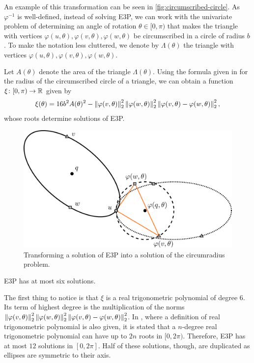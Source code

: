 An example of this transformation can be seen in \autoref{fig:circumscribed-circle}. As $\varphi^{-1}$ is well-defined, instead of solving E3P, we can work with the univariate problem of determining an angle of rotation $\theta \in [0, \pi)$ that makes the triangle with vertices $\varphi(u, \theta), \varphi(v, \theta), \varphi(w, \theta)$ be circumscribed in a circle of radius $b$. To make the notation less cluttered, we denote by $\Lambda(\theta)$ the triangle with vertices $\varphi(u, \theta), \varphi(v, \theta), \varphi(w, \theta)$.

Let $A(\theta)$ denote the area of the triangle $\Lambda(\theta)$. Using the formula given in \cite[p.~189]{johnson1960} for the radius of the circumscribed circle of a triangle, we can obtain a function $\xi \colon [0, \pi) \to \mathbb{R}$ given by
\begin{equation}\label{eq:circumscribed_circle_b}
\xi(\theta) = 16b^2A(\theta)^2 - \left\lVert\varphi(v, \theta)\right\rVert_{2}^2\left\lVert\varphi(w, \theta)\right\rVert_{2}^2\left\lVert\varphi(v, \theta)-\varphi(w, \theta)\right\rVert_{2}^2,
\end{equation}
whose roots determine solutions of E3P.

\begin{figure}
	\centering

	\includegraphics[scale=.3]{../tex/figures/circumscribed-circle}
	\caption{Transforming a solution of E3P into a solution of the circumradius problem.}
	\label{fig:circumscribed-circle}
\end{figure}

\begin{lem}
	E3P has at most six solutions.
\end{lem}

\begin{pf}
	The first thing to notice is that $\xi$ is a real trigonometric polynomial of degree $6$. 
	Its term of highest degree is the multiplication of the norms $\left\lVert\varphi(v, \theta)\right\rVert_{2}^2\left\lVert\varphi(w, \theta)\right\rVert_{2}^2\left\lVert\varphi(v, \theta)-\varphi(w, \theta)\right\rVert_{2}^2$. In \cite[p.~150]{powell}, where a definition of real trigonometric polynomial is also given, it is stated that a $n$-degree real trigonometric polynomial can have up to $2n$ roots in $[0, 2\pi)$. Therefore, E3P has at most $12$ solutions in $[0, 2\pi]$.
	Half of these solutions, though, are duplicated as ellipses are symmetric to their axis.
\end{pf}

